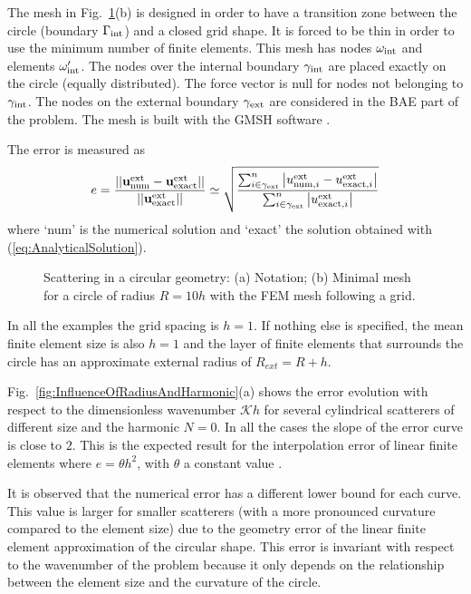 \documentclass[12pt]{article}
\newcommand{\rin}{{\rm int}}
\newcommand{\rex}{{\rm ext}}
\newcommand{\K}{\mathcal{K}}
\newcommand{\fref}[1]{Fig.~\ref{#1}}
\begin{document}
The mesh in \fref{fig:TheMesh}(b) is designed in order to have a transition zone between the circle (boundary $\Gamma_\rin$) and a closed grid shape. It is forced to be thin in order to use the minimum number of finite elements. This mesh has nodes $\omega_\rin$ and elements $\omega'_\rin$. The nodes over the internal boundary $\gamma_\rin$ are placed exactly on the circle (equally distributed). The force vector is null for nodes not belonging to $\gamma_\rin$. The nodes on the external boundary $\gamma_\rex$ are considered in the BAE part of the problem. The mesh is built with the GMSH software \cite{Geuzaine-Remacle:2009}.

The error is measured as
\begin{equation}
 e = \frac{\left|\left| \mathbf{u}^\rex_{\mathrm{num}} - \mathbf{u}^\rex_{\mathrm{exact}}\right|\right|}{\left|\left| \mathbf{u}^\rex_{\mathrm{exact}}\right|\right|} \simeq \sqrt{\frac{\sum_{i \in \gamma_\rex}^{n} \left| u^\rex_{\mathrm{num},i} - u^\rex_{\mathrm{exact},i}\right|}{\sum_{i \in \gamma_\rex}^{n} \left|u^\rex_{\mathrm{exact},i}\right|}}
\end{equation}
where `num' is the numerical solution and `exact' the solution obtained with (\ref{eq:AnalyticalSolution}).

\begin{figure}[ht]
 
\caption{Scattering in a circular geometry: (a) Notation; (b) Minimal mesh for a circle of radius $R = 10h$ with the FEM mesh following a grid.}
\label{fig:TheMesh}
\end{figure}

In all the examples the grid spacing is $h = 1$. If nothing else is specified, the mean finite element size is also $h = 1$ and the layer of finite elements that surrounds the circle has an approximate external radius of $R_{ext} = R + h$.

\fref{fig:InfluenceOfRadiusAndHarmonic}(a) shows the error evolution with respect to the  dimensionless wavenumber  $\K h$ for several cylindrical scatterers of different size and the harmonic $N=0$. In all the cases the slope of the error curve is close to $2$. This is the expected result for the interpolation error of linear finite elements where $e = \theta h^{2}$, with $\theta$ a constant value \cite{Bouillard-Ihlenburg:99}.

It is observed that the numerical error has a different lower bound for each curve. This value is larger for smaller scatterers (with a more pronounced curvature compared to the element size) due to the geometry error of the linear finite element approximation of the circular shape. This error is invariant with respect to the wavenumber of the problem because it only depends on the relationship between the element size and the curvature of the circle. 
\end{document}
